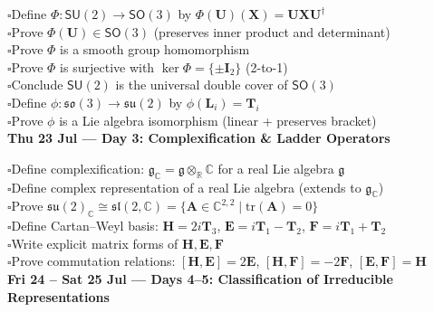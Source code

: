 \documentclass[11pt]{article}
\newcommand{\todo}{\textcolor{pending}{\Large $\square$}}
\newcommand{\secname}[1]{\vspace{1em}\noindent\textcolor{sectioncolor}{\Large\bfseries #1}}
\newcommand{\so}{\mathfrak{so}}
\newcommand{\su}{\mathfrak{su}}
\newcommand{\SO}{\mathsf{SO}}
\newcommand{\SU}{\mathsf{SU}}
\newcommand{\g}{\mathfrak{g}}
\newcommand{\C}{\mathbb{C}}
\newcommand{\R}{\mathbb{R}}
\newcommand{\herm}{^{\dagger}}
\newcommand{\st}{\mid}
\newcommand{\tr}{\mathrm{tr}}
\begin{document}
\todo\quad Define $\Phi:\SU(2)\to\SO(3)$ by $\Phi(\bm U)(\bm X)=\bm U\bm X\bm U\herm$\\
\todo\quad Prove $\Phi(\bm U)\in\SO(3)$ (preserves inner product and determinant)\\
\todo\quad Prove $\Phi$ is a smooth group homomorphism\\
\todo\quad Prove $\Phi$ is surjective with $\ker\Phi=\{\pm\bm I_2\}$ (2-to-1)\\
\todo\quad Conclude $\SU(2)$ is the universal double cover of $\SO(3)$\\
\todo\quad Define $\phi:\so(3)\to\su(2)$ by $\phi(\bm L_i)=\bm T_i$\\
\todo\quad Prove $\phi$ is a Lie algebra isomorphism (linear + preserves bracket)\\

\secname{Thu 23 Jul --- Day 3: Complexification \& Ladder Operators}

\todo\quad Define complexification: $\g_\C=\g\otimes_\R\C$ for a real Lie algebra $\g$\\
\todo\quad Define complex representation of a real Lie algebra (extends to $\g_\C$)\\
\todo\quad Prove $\su(2)_\C\cong\mathfrak{sl}(2,\C)=\{\bm A\in\C^{2,2}\st\tr(\bm A)=0\}$\\
\todo\quad Define Cartan--Weyl basis: $\bm H=2i\bm T_3$, $\bm E=i\bm T_1-\bm T_2$, $\bm F=i\bm T_1+\bm T_2$\\
\todo\quad Write explicit matrix forms of $\bm H,\bm E,\bm F$\\
\todo\quad Prove commutation relations: $[\bm H,\bm E]=2\bm E$, $[\bm H,\bm F]=-2\bm F$, $[\bm E,\bm F]=\bm H$\\

\secname{Fri 24 -- Sat 25 Jul --- Days 4--5: Classification of Irreducible Representations}
\end{document}
